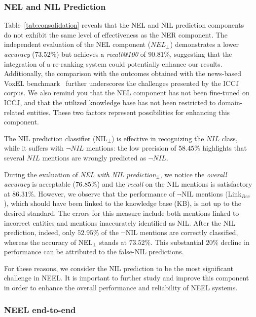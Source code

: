 

\subsubsection{NEL and NIL Prediction}

Table~\ref{tab:consolidation} reveals that the NEL and NIL prediction components do not exhibit the same level of effectiveness as the NER component. The independent evaluation of the NEL component ($NEL_\perp$) demonstrates a lower \textit{accuracy} ($73.52\%$) but achieves a \textit{recall@100} of $90.81\%$, suggesting that the integration of a re-ranking system could potentially enhance our results. Additionally, the comparison with the outcomes obtained with the news-based VoxEL benchmark~\cite{rosales2018voxel} further underscores the challenges presented by the ICCJ corpus. We also remind you that the NEL component has not been fine-tuned on ICCJ, and that the utilized knowledge base has not been restricted to domain-related entities. These two factors represent possibilities for enhancing this component.

The NIL prediction classifier (NIL$_\perp$) is effective in recognizing the $NIL$ class, while it suffers with $\neg{NIL}$ mentions: the low precision of $58.45\%$ highlights that several $NIL$ mentions are wrongly predicted as $\neg{NIL}$.


During the evaluation of \textit{NEL with NIL prediction$_\perp$}, we notice the \textit{overall accuracy} is acceptable ($76.85\%$) and the \textit{recall} on the NIL mentions is satisfactory at $86.31\%$. However, we observe that the performance of $\neg$NIL mentions (Link$_{Rec}$), which should have been linked to the knowledge base (KB), is not up to the desired standard. The errors for this measure include both mentions linked to incorrect entities and mentions inaccurately identified as NIL. After the NIL prediction, indeed, only $52.95\%$ of the $\neg$NIL mentions are correctly classified, whereas the accuracy of NEL$_\perp$ stands at $73.52\%$. This substantial $20\%$ decline in performance can be attributed to the false-NIL predictions.

For these reasons, we consider the NIL prediction to be the most significant challenge in NEEL. It is important to further study and improve this component in order to enhance the overall performance and reliability of NEEL systems.





\subsubsection{NEEL end-to-end}

